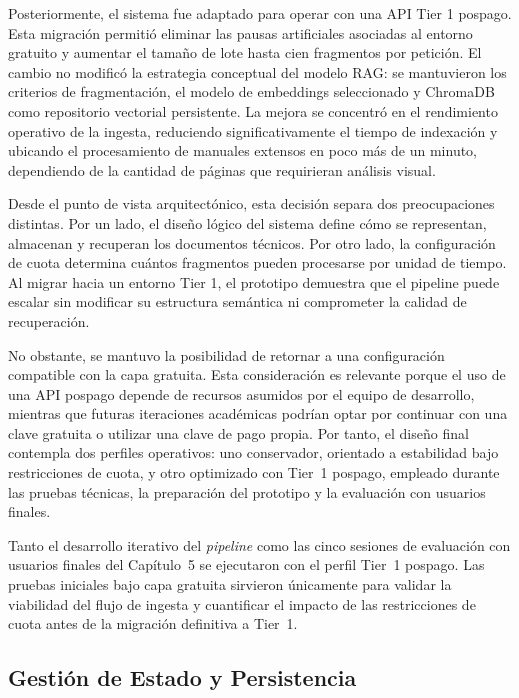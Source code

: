 {{Posteriormente, el sistema fue adaptado para operar con una API Tier 1 pospago. Esta migración permitió eliminar las pausas artificiales asociadas al entorno gratuito y aumentar el tamaño de lote hasta cien fragmentos por petición. El cambio no modificó la estrategia conceptual del modelo RAG: se mantuvieron los criterios de fragmentación, el modelo de embeddings seleccionado y ChromaDB como repositorio vectorial persistente. La mejora se concentró en el rendimiento operativo de la ingesta, reduciendo significativamente el tiempo de indexación y ubicando el procesamiento de manuales extensos en poco más de un minuto, dependiendo de la cantidad de páginas que requirieran análisis visual.

Desde el punto de vista arquitectónico, esta decisión separa dos preocupaciones distintas. Por un lado, el diseño lógico del sistema define cómo se representan, almacenan y recuperan los documentos técnicos. Por otro lado, la configuración de cuota determina cuántos fragmentos pueden procesarse por unidad de tiempo. Al migrar hacia un entorno Tier 1, el prototipo demuestra que el pipeline puede escalar sin modificar su estructura semántica ni comprometer la calidad de recuperación.

No obstante, se mantuvo la posibilidad de retornar a una configuración compatible con la capa gratuita. Esta consideración es relevante porque el uso de una API pospago depende de recursos asumidos por el equipo de desarrollo, mientras que futuras iteraciones académicas podrían optar por continuar con una clave gratuita o utilizar una clave de pago propia. Por tanto, el diseño final contempla dos perfiles operativos: uno conservador, orientado a estabilidad bajo restricciones de cuota, y otro optimizado con Tier~1 pospago, empleado durante las pruebas técnicas, la preparación del prototipo y la evaluación con usuarios finales.

Tanto el desarrollo iterativo del \textit{pipeline} como las cinco sesiones de evaluación con usuarios finales del Capítulo~5 se ejecutaron con el perfil Tier~1 pospago. Las pruebas iniciales bajo capa gratuita sirvieron únicamente para validar la viabilidad del flujo de ingesta y cuantificar el impacto de las restricciones de cuota antes de la migración definitiva a Tier~1.

\subsection{Gestión de Estado y Persistencia}

}}
